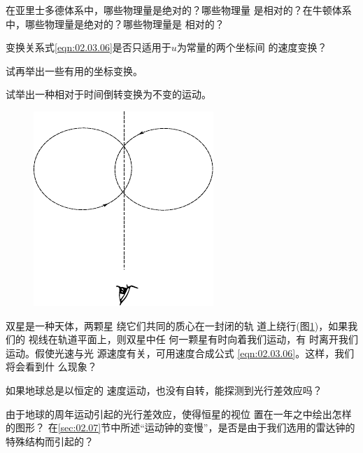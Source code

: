 \begin{questions}

  \question 在亚里士多德体系中，哪些物理量是绝对的？哪些物理量
  是相对的？在牛顿体系中，哪些物理量是绝对的？哪些物理量是
  相对的？

  \question 变换关系式\eqref{eqn:02.03.06}是否只适用于$u$为常量的两个坐标间
  的速度变换？

  \question 试再举出一些有用的坐标变换。

  \question 试举出一种相对于时间倒转变换为不变的运动。

  \begin{figure}
    \includegraphics{figure/fig02.16}
    \caption{}
    \label{fig:02.16}
  \end{figure}

  \question 双星是一种天体，两颗星
  绕它们共同的质心在一封闭的轨
  道上绕行(图\ref{fig:02.16})，如果我们的
  视线在轨道平面上，则双星中任
  何一颗星有时向着我们运动，有
  时离开我们运动。假使光速与光
  源速度有关，可用速度合成公式
  \eqref{eqn:02.03.06}。这样，我们将会看到什
  么现象？

  \question 如果地球总是以恒定的
  速度运动，也没有自转，能探测到光行差效应吗？

  \question 由于地球的周年运动引起的光行差效应，使得恒星的视位
  置在一年之中绘出怎样的图形？
  \clearpage
  \question 在\ref{sec:02.07}节中所述“运动钟的变慢”，是否是由于我们选用的雷达钟的特殊结构而引起的？
\end{questions}
